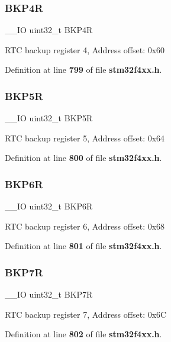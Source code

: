 \subsubsection{B\+K\+P4R}
{\footnotesize\ttfamily \+\_\+\+\_\+\+IO uint32\+\_\+t B\+K\+P4R}

R\+TC backup register 4, Address offset\+: 0x60 

Definition at line \textbf{ 799} of file \textbf{ stm32f4xx.\+h}.

\mbox{\label{structRTC__TypeDef_ab6bed862c0d0476ff4f89f7b9bf3e130}} 
\subsubsection{B\+K\+P5R}
{\footnotesize\ttfamily \+\_\+\+\_\+\+IO uint32\+\_\+t B\+K\+P5R}

R\+TC backup register 5, Address offset\+: 0x64 

Definition at line \textbf{ 800} of file \textbf{ stm32f4xx.\+h}.

\mbox{\label{structRTC__TypeDef_a1d854d2d7f0452f4c90035952b92d2ba}} 
\subsubsection{B\+K\+P6R}
{\footnotesize\ttfamily \+\_\+\+\_\+\+IO uint32\+\_\+t B\+K\+P6R}

R\+TC backup register 6, Address offset\+: 0x68 

Definition at line \textbf{ 801} of file \textbf{ stm32f4xx.\+h}.

\mbox{\label{structRTC__TypeDef_a2ca54ce1a8d2fa9d1ba6d5987ed5e2cf}} 
\subsubsection{B\+K\+P7R}
{\footnotesize\ttfamily \+\_\+\+\_\+\+IO uint32\+\_\+t B\+K\+P7R}

R\+TC backup register 7, Address offset\+: 0x6C 

Definition at line \textbf{ 802} of file \textbf{ stm32f4xx.\+h}.

